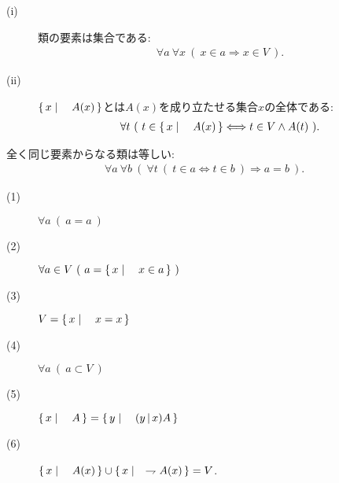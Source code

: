 	
	\begin{screen}
		\begin{axm}[類の公理]\mbox{}
			\begin{description}
				\item[(i)] 類の要素は集合である:
					\begin{align}
						\forall a\ \forall x\ (\ x \in a \Longrightarrow x \in V\ ).
					\end{align}
				
				\item[(ii)] $\left\{\, x \mid \quad A(x)\, \right\}$とは$A(x)$を成り立たせる集合$x$の全体である:
					\begin{align}
						\forall t\ (\ t \in \left\{\, x \mid \quad A(x)\, \right\} \Longleftrightarrow t \in V \wedge A(t)\ ).
					\end{align}
			\end{description}
		\end{axm}
	\end{screen}
	
	\begin{screen}
		\begin{axm}[外延性の公理]
			全く同じ要素からなる類は等しい:
			\begin{align}
				\forall a\ \forall b\ \left(\ \forall t\ (\ t \in a  \Longleftrightarrow t \in b\ )
				\Longrightarrow a=b\ \right).
			\end{align}
		\end{axm}
	\end{screen}
	
	\begin{screen}
		\begin{thm}\mbox{}
			\begin{description}
				\item[(1)] $\forall a\ (\ a=a\ )$
				\item[(2)] $\forall a \in V\ (\ a = \Set{x}{x \in a}\ )$
				\item[(3)] $V=\left\{\, x \mid \quad x=x\, \right\}$
				\item[(4)] $\forall a\ (\ a \subset V\ )$
				\item[(5)] $\left\{\, x \mid \quad A\, \right\} = \left\{\, y \mid \quad (y\, |\, x)A\, \right\}$
				\item[(6)] $\left\{\, x \mid \quad A(x)\, \right\} \cup \left\{\, x \mid \quad \rightharpoondown A(x)\, \right\} = V$.
			\end{description}
		\end{thm}
	\end{screen}
	

